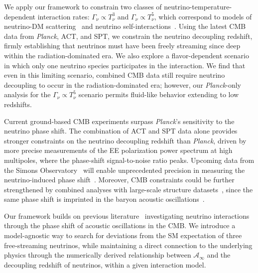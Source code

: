 We apply our framework to constrain two classes of neutrino-temperature-dependent interaction rates: $\Gamma_\nu \propto T_\nu^3$ and $\Gamma_\nu \propto T_\nu^5$, which correspond to models of neutrino-DM scattering~\cite{Boehm:2003hm,Stadler:2019dii,Serra:2009uu,Olivares-DelCampo:2017feq,Ghosh:2017jdy,Ghosh:2024wva,Wilkinson:2014ksa,Escudero:2015yka,DiValentino:2017oaw,Ghosh:2019tab,Mosbech:2020ahp} and neutrino self-interactions~\cite{Cyr-Racine:2013jua,Oldengott:2014qra,Oldengott:2017fhy,Kreisch:2019yzn,Das:2020xke,Das:2023npl,RoyChoudhury:2020dmd,Lancaster:2017ksf,Camarena:2023cku,Poudou:2025qcx,He:2023oke,He:2025jwp}. Using the latest CMB data from \textit{Planck}, ACT, and SPT, we constrain the neutrino decoupling redshift, firmly establishing that neutrinos must have been freely streaming since deep within the radiation-dominated era.
We also explore a flavor-dependent scenario in which only one neutrino species participates in the interaction. We find that even in this limiting scenario, combined CMB data still require neutrino decoupling to occur in the radiation-dominated era; however, our \textit{Planck}-only analysis for the $\Gamma_\nu \propto T_\nu^5$ scenario permits fluid-like behavior extending to low redshifts.

Current ground-based CMB experiments surpass \textit{Planck}'s sensitivity to the neutrino phase shift. The combination of ACT and SPT data alone provides stronger constraints on the neutrino decoupling redshift than \textit{Planck}, driven by more precise measurements of the EE polarization power spectrum at high multipoles, where the phase-shift signal-to-noise ratio peaks.
Upcoming data from the Simons Observatory~\cite{SimonsObservatory:2025wwn} will enable unprecedented precision in measuring the neutrino-induced phase shift~\cite{Montefalcone:2025unv}. Moreover, CMB constraints could be further strengthened by combined analyses with large-scale structure datasets~\cite{Baumann:2017gkg,Baumann:2019keh,Whitford:2024ecj}, since the same phase shift is imprinted in the baryon acoustic oscillations~\cite{Baumann:2017lmt,Baumann:2017gkg,Green:2020fjb, Montefalcone:2025mbg}.

Our framework builds on previous literature~\cite{Follin:2015hya, Baumann:2015rya, Pan:2016zla, Baumann:2017gkg, Choi:2018gho, Baumann:2019keh,Ghosh:2019tab,Brinckmann:2020bcn,Ge:2022qws,Taule:2022jrz,Ghosh:2024wva,Whitford:2024ecj,Montefalcone:2025unv, Saravanan:2025cyi, Montefalcone:2025mbg} investigating neutrino interactions through the phase shift of acoustic oscillations in the CMB. We introduce a model-agnostic way to search for deviations from the SM expectation of three free-streaming neutrinos, while maintaining a direct connection to the underlying physics through the numerically derived relationship between $\mathcal{A}_\infty$ and the decoupling redshift of neutrinos, within a given interaction model.

